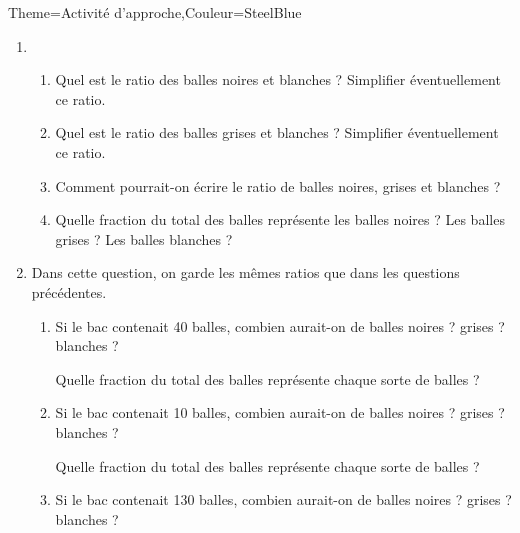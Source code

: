 \begin{Maquette}[Cours]{Theme={Activité d'approche},Couleur={SteelBlue}}
\begin{AActivite}
\begin{enumerate}
            \item 
               \begin{enumerate}
                  \item Quel est le ratio des balles noires et blanches ? Simplifier éventuellement ce ratio. \par \smallskip
                     \pointilles
                  \item Quel est le ratio des balles grises et blanches ? Simplifier éventuellement ce ratio. \par \smallskip
                     \pointilles
                  \item Comment pourrait-on écrire le ratio de balles noires, grises et blanches ? \par \smallskip
                     \pointilles
                  \item Quelle fraction du total des balles représente les balles noires ? Les balles grises ? Les balles blanches ? \par \smallskip
                     \pointilles
               \end{enumerate}
            \item Dans cette question, on garde les mêmes ratios que dans les questions précédentes.
               \begin{enumerate}
                  \item Si le bac contenait 40 balles, combien aurait-on de balles noires ? grises ? blanches ? \par \smallskip
                     \pointilles \par
                     Quelle fraction du total des balles représente chaque sorte de balles ? \par \smallskip
                     \pointilles
                  \item Si le bac contenait 10 balles, combien aurait-on de balles noires ? grises ? blanches ? \par \smallskip
                     \pointilles \par
                     Quelle fraction du total des balles représente chaque sorte de balles ? \par \smallskip
                     \pointilles
                  \item Si le bac contenait 130 balles, combien aurait-on de balles noires ? grises ? blanches ? \par \smallskip
                     \pointilles \par

\end{enumerate}
\end{enumerate}
\end{AActivite}
\end{Maquette}
